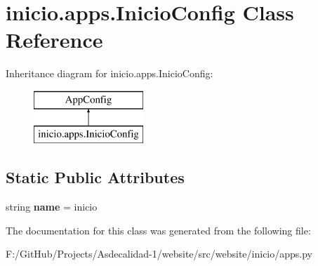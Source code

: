 \hypertarget{classinicio_1_1apps_1_1_inicio_config}{}\section{inicio.\+apps.\+Inicio\+Config Class Reference}
\label{classinicio_1_1apps_1_1_inicio_config}
Inheritance diagram for inicio.\+apps.\+Inicio\+Config\+:\begin{figure}[H]
\begin{center}
\leavevmode
\includegraphics[height=2.000000cm]{classinicio_1_1apps_1_1_inicio_config}
\end{center}
\end{figure}
\subsection*{Static Public Attributes}
\begin{DoxyCompactItemize}
\item 
\mbox{\label{classinicio_1_1apps_1_1_inicio_config_adf2662135be60120a99393a8211b1c92}} 
string {\bfseries name} = \textquotesingle{}inicio\textquotesingle{}
\end{DoxyCompactItemize}


The documentation for this class was generated from the following file\+:\begin{DoxyCompactItemize}
\item 
F\+:/\+Git\+Hub/\+Projects/\+Asdecalidad-\/1/website/src/website/inicio/apps.\+py\end{DoxyCompactItemize}
